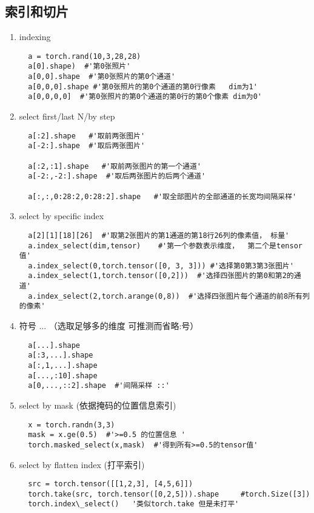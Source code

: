 \subsection{索引和切片}
\begin{enumerate}
  \item indexing
  \begin{lstlisting}
  a = torch.rand(10,3,28,28)
  a[0].shape)  #'第0张照片'
  a[0,0].shape  #'第0张照片的第0个通道'
  a[0,0,0].shape #'第0张照片的第0个通道的第0行像素   dim为1'
  a[0,0,0,0]  #'第0张照片的第0个通道的第0行的第0个像素 dim为0'
  \end{lstlisting}

  \item select first/last N/by step
  \begin{lstlisting}
  a[:2].shape   #'取前两张图片'
  a[-2:].shape  #'取后两张图片'

  a[:2,:1].shape   #'取前两张图片的第一个通道'
  a[-2:,-2:].shape  #'取后两张图片的后两个通道'

  a[:,:,0:28:2,0:28:2].shape   #'取全部图片的全部通道的长宽均间隔采样'
  \end{lstlisting}

  \item select by specific index
  \begin{lstlisting}
  a[2][1][18][26]  #'取第2张图片的第1通道的第18行26列的像素值， 标量'
  a.index_select(dim,tensor)    #'第一个参数表示维度，  第二个是tensor值'
  a.index_select(0,torch.tensor([0, 3, 3])) #'选择第0第3第3张图片'
  a.index_select(1,torch.tensor([0,2]))  #'选择四张图片的第0和第2的通道'
  a.index_select(2,torch.arange(0,8))  #'选择四张图片每个通道的前8所有列的像素'
  \end{lstlisting}

  \item 符号 ... （选取足够多的维度  可推测而省略:号）
  \begin{lstlisting}
  a[...].shape
  a[:3,...].shape
  a[:,1,...].shape
  a[...,:10].shape
  a[0,...,::2].shape  #'间隔采样 ::'
  \end{lstlisting}

  \item select by mask (依据掩码的位置信息索引)
  \begin{lstlisting}
  x = torch.randn(3,3)
  mask = x.ge(0.5)  #'>=0.5 的位置信息 '
  torch.masked_select(x,mask)  #'得到所有>=0.5的tensor值'
  \end{lstlisting}

  \item select by flatten index (打平索引)
  \begin{lstlisting}
  src = torch.tensor([[1,2,3], [4,5,6]])
  torch.take(src, torch.tensor([0,2,5])).shape     #torch.Size([3])
  torch.index\_select()   '类似torch.take 但是未打平'
  \end{lstlisting}
\end{enumerate}


